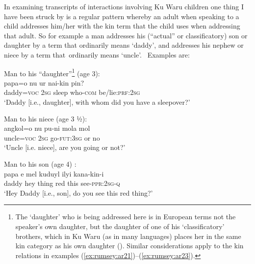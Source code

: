\documentclass[output=paper]{langsci/langscibook}
\begin{document}
In examining transcripts of interactions involving Ku Waru children one thing I have been struck by is a regular pattern whereby an adult when speaking to a child addresses him/her with the kin term that the child uses when addressing that adult. So for example a man addresses his (“actual” or classificatory) son or daughter by a term that ordinarily means ‘daddy’, and addresses his nephew or niece by a term that ordinarily means ‘uncle’.  Examples are:

\begin{exe}
	\ex Man to his “daughter”\footnote{The ‘daughter’ who is being addressed here is in European terms not the speaker’s own daughter, but the daughter of one of his ‘classificatory’ brothers, which in Ku Waru (as in many languages) places her in the same kin category as his own daughter (\citealt{Kroeber1909}). Similar considerations apply to the kin relations in examples  (\ref{ex:rumsey:ar21})--(\ref{ex:rumsey:ar23}).} (age 3):\label{ex:rumsey:ar20}\\
	\gll papa=o nu ur nai-kin pin?\\
	daddy=\textsc{voc} 2\textsc{sg}	sleep who-\textsc{com} be/lie:\textsc{prf}:2\textsc{sg}\\
	\trans ‘Daddy [i.e., daughter], with whom did you have a sleepover?’
\end{exe}

\begin{exe}
	\ex Man to his niece (age 3 ½):\label{ex:rumsey:ar21}\\
	\gll angkol=o nu pu-ni mola mol\\
	uncle=\textsc{voc} 2\textsc{sg} go-\textsc{fut}:3\textsc{sg} or no\\
	\trans ‘Uncle [i.e. niece], are you going or not?’
\end{exe}

\begin{exe}
	\ex Man to his son	(age 4)	:\label{ex:rumsey:ar22}\\
	\gll papa e mel kuduyl ilyi kana-kin-i\\
	daddy hey thing red this see-\textsc{ppr}:2\textsc{sg}-\textsc{q}\\
	\trans ‘Hey Daddy [i.e., son], do you see this red thing?’
\end{exe}
\end{document}
